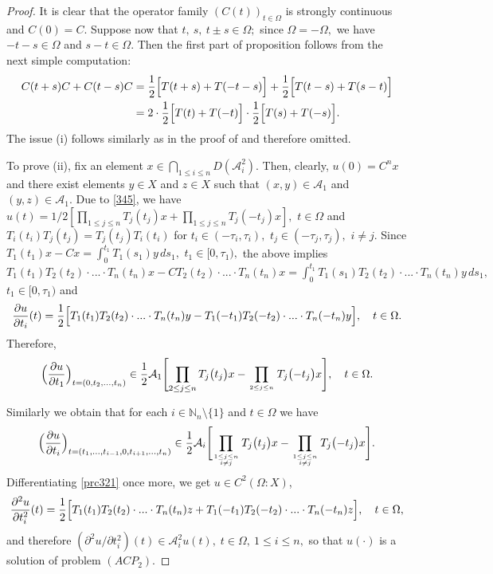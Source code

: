 \documentclass{amsart}
\theoremstyle{definition}
\theoremstyle{remark}
\numberwithin{equation}{section}
\begin{document}
\begin{proof}
It is clear that the operator family $(C(t))_{t\in \Omega}$ is strongly continuous and $C(0)=C.$ 
Suppose now that $t,\ s,\ t\pm s\in \Omega ;$ since $\Omega=-\Omega,$ we have $-t-s\in \Omega$ and $s-t\in \Omega.$ Then the first part of proposition follows from the next simple computation:
\begin{align*}
C(t+s)C+C(t-s)C&=\frac{1}{2}\Bigl[ T(t+s)+T(-t-s)\Bigr]+\frac{1}{2}\Bigl[ T(t-s)+T(s-t)\Bigr]
\\& =2\cdot \frac{1}{2}\Bigl[ T(t)+T(-t)\Bigr] \cdot \frac{1}{2}\Bigl[ T(s)+T(-s)\Bigr].
\end{align*}
The issue (i) follows similarly as in the proof of \cite[Proposition 2.1.17]{knjigah} and therefore omitted. 

To prove (ii), fix an element $x\in \bigcap_{1\leq i \leq n}D({\mathcal A}_{i}^{2})$. Then, clearly, $u(0)=C^{n}x$ and there exist elements $y\in X$ and $z\in X$ such that $(x,y)\in {\mathcal A}_{1}$ and  $(y,z)\in {\mathcal A}_{1}.$ Due to \eqref{345}, we have $u(t)=1/2[   
\prod_{1\leq j\le n} T_{j}( t_{j})x+\prod_{1\leq j\le n} T_{j}( -t_{j})x],$ $t\in \Omega$ and $T_{i}(t_{i})T_{j}(t_{j})=T_{j}(t_{j})T_{i}(t_{i})
 $ for $t_{i} \in (-\tau_{i},\tau_{i}),$ $ t_{j} \in (-\tau_{j},\tau_{j}),$ $i\neq j.$ Since $T_{1}(t_{1})x-Cx=\int^{t_{1}}_{0}T_{1}(s_{1})y\, ds_{1},$ $t_{1}\in [0,\tau_{1}),$ the above implies $T_{1}(t_{1})T_{2}(t_{2})\cdot ... \cdot T_{n}(t_{n})x-CT_{2}(t_{2})\cdot ... \cdot T_{n}(t_{n})x=\int^{t_{1}}_{0}T_{1}(s_{1})T_{2}(t_{2})\cdot ... \cdot T_{n}(t_{n})y\, ds_{1},$ $t_{1}\in [0,\tau_{1})$ and
\begin{align}\label{prc321}
\frac{\partial u}{\partial t_{i}}(t)=\frac{1}{2}\Bigl[ T_{1}(t_{1})T_{2}(t_{2})\cdot ... \cdot T_{n}(t_{n})y-T_{1}(-t_{1})T_{2}(-t_{2})\cdot ... \cdot T_{n}(-t_{n})y\Bigr],\quad t\in \Omega.
\end{align}
Therefore,
$$
\Bigl( \frac{\partial u}{\partial t_{1}}\Bigr)_{t=(0,t_{2},...,t_{n})} \in \frac{1}{2}{\mathcal A}_{1}\Biggl[       
\prod_{2\le j\le n} T_{j}\bigl( t_{j}\bigr)x-\prod_{2\leq j\leq n\atop} T_{j}\bigl( -t_{j}\bigr)x\Biggr],\quad t\in \Omega.
$$
Similarly we obtain that for each $i\in {\mathbb N}_{n} \setminus \{1\}$ and $t\in \Omega$ we have $$
\Bigl( \frac{\partial u}{\partial t_{i}}\Bigr)_{t=(t_{1},...,t_{i-1},0,t_{i+1},...,t_{n})} \in \frac{1}{2}{\mathcal A}_{i}\Biggl[       
\prod_{1\le j\le n\atop i\ne j} T_{j}\bigl( t_{j}\bigr)x-\prod_{1\leq j\leq n\atop i\neq j} T_{j}\bigl( -t_{j}\bigr)x\Biggr].$$
Differentiating \eqref{prc321} once more, we get $u\in C^{2}(\Omega : X)$,
$$
\frac{\partial ^{2}u}{\partial t_{i}^{2}}(t)=\frac{1}{2}\Bigl[ T_{1}(t_{1})T_{2}(t_{2})\cdot ... \cdot T_{n}(t_{n})z+T_{1}(-t_{1})T_{2}(-t_{2})\cdot ... \cdot T_{n}(-t_{n})z\Bigr],\quad t\in \Omega ,
$$
and therefore $(\partial ^{2}u/\partial t_{i}^{2})(t)\in {\mathcal A}_{i}^{2}u(t),\;t \in \Omega,\ 1\leq i\leq n,$ so that $u(\cdot)$ is  a solution of problem $(ACP_{2}).$ 


\end{proof}
\end{document}
